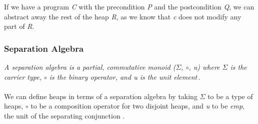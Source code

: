If we have a program {\it C} with the precondition {\it P} and the postcondition {\it Q}, we can abstract away the rest of the heap {\it R}, as we know that {\it c} does not modify any part of {\it R}.


\subsubsection{Separation Algebra}
\textit{A separation algebra is a partial, commutative monoid ($\Sigma$, $\circ$, {\it u}) where $\Sigma$ is the carrier type, $\circ$ is the binary operator, and {\it u} is the unit element}\,\cite{Calcagno07:LCS}.

\paragraph{}
We can define heaps in terms of a separation algebra by taking $\Sigma$ to be a type of heaps, $\circ$ to be a composition operator for two disjoint heaps, and {\it u} to be {\it emp}, the unit of the separating conjunction \cite{BirkedalL:veroop-conf}.

